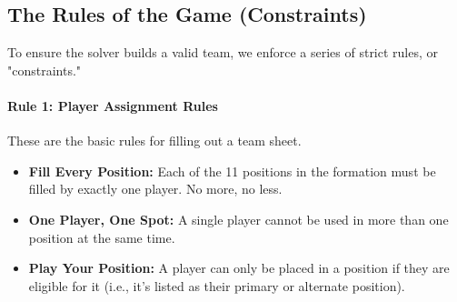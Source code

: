 \documentclass{article}
\begin{document}
\subsection{The Rules of the Game (Constraints)}
To ensure the solver builds a valid team, we enforce a series of strict rules, or "constraints."

\paragraph{Rule 1: Player Assignment Rules}
These are the basic rules for filling out a team sheet.
\begin{itemize}
    \item \textbf{Fill Every Position:} Each of the 11 positions in the formation must be filled by exactly one player. No more, no less.
    \item \textbf{One Player, One Spot:} A single player cannot be used in more than one position at the same time.
    \item \textbf{Play Your Position:} A player can only be placed in a position if they are eligible for it (i.e., it's listed as their primary or alternate position).
\end{itemize}
\end{document}
